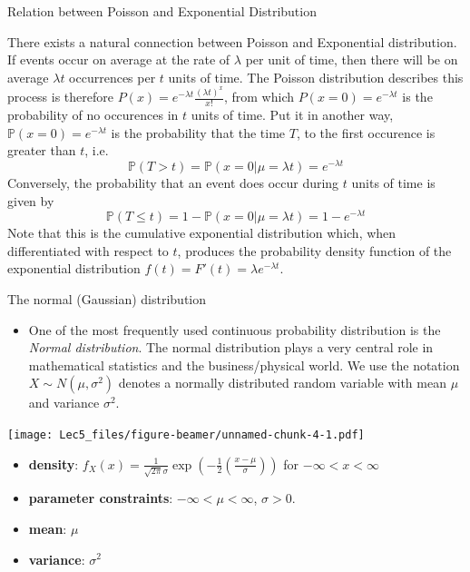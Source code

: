 \documentclass[ignorenonframetext,]{beamer}
\providecommand{\tightlist}{%
  \setlength{\itemsep}{0pt}\setlength{\parskip}{0pt}}
\begin{document}
\begin{frame}{Relation between Poisson and Exponential Distribution}

There exists a natural connection between Poisson and Exponential
distribution. If events occur on average at the rate of \(\lambda\) per
unit of time, then there will be on average \(\lambda t\) occurrences
per \(t\) units of time. The Poisson distribution describes this process
is therefore \(P(x)=e^{-\lambda t}\frac{(\lambda t)^x}{x!}\), from which
\(P(x=0)=e^{-\lambda t}\) is the probability of no occurences in \(t\)
units of time. Put it in another way, \(\mathbb{P}(x=0)=e^{-\lambda t}\)
is the probability that the time \(T\), to the first occurence is
greater than \(t\), i.e.
\[\mathbb{P}(T>t)=\mathbb{P}(x=0|\mu=\lambda t)=e^{-\lambda t}\]
Conversely, the probability that an event does occur during \(t\) units
of time is given by
\[\mathbb{P}(T\le t)=1-\mathbb{P}(x=0|\mu=\lambda t)=1-e^{-\lambda t}\]
Note that this is the cumulative exponential distribution which, when
differentiated with respect to \(t\), produces the probability density
function of the exponential distribution
\(f(t)=F'(t)=\lambda e^{-\lambda t}\).

\end{frame}

\begin{frame}{The normal (Gaussian) distribution}

\begin{itemize}
\tightlist
\item
  One of the most frequently used continuous probability distribution is
  the \emph{Normal distribution}. The normal distribution plays a very
  central role in mathematical statistics and the business/physical
  world. We use the notation \(X\sim N(\mu,\sigma^2)\) denotes a
  normally distributed random variable with mean \(\mu\) and variance
  \(\sigma^2\).
\end{itemize}

\texttt{[image: Lec5\_files/figure-beamer/unnamed-chunk-4-1.pdf]}

\begin{itemize}
\item
  \textbf{density}:
  \(f_X(x)=\frac{1}{\sqrt{2\pi}\sigma}\exp\left(-\frac{1}{2}\left(\frac{x-\mu}{\sigma}\right)\right)\)
  for \(-\infty<x<\infty\)
\item
  \textbf{parameter constraints}: \(-\infty<\mu<\infty\), \(\sigma>0\).
\item
  \textbf{mean}: \(\mu\)
\item
  \textbf{variance}: \(\sigma^2\)
\end{itemize}

\end{frame}
\end{document}
